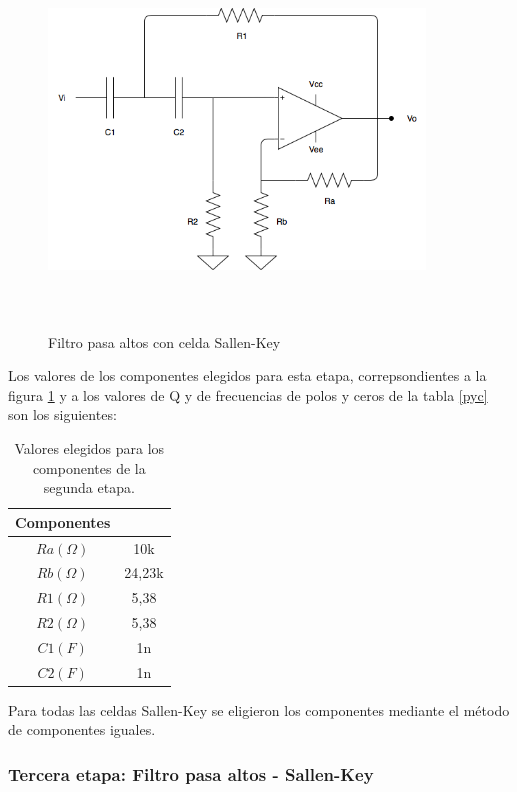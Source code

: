  \begin{figure}[H] %
	\centering
	\includegraphics[width=10cm,height=10cm,keepaspectratio]{../Imagenes/sk.png}
	\caption{Filtro pasa altos con celda Sallen-Key}
	\label{sk}
\end{figure}

Los valores de los componentes elegidos para esta etapa, correpsondientes a la figura \ref{sk} y a los valores de Q y de frecuencias de polos y ceros de la tabla \ref{pyc} son los siguientes:

\begin{table}[H] 
	\centering
	\begin{tabular}{c c}
		Componentes \\
		\hline
		$Ra (\Omega)$ &  10k \\
		$Rb (\Omega)$ & 24,23k\\
		$R1 (\Omega)$ &  5,38 \\
		$R2 (\Omega)$ &  5,38 \\
		$C1 (F)$ & 1n \\
		$C2 (F)$ & 1n \\
		\hline
	\end{tabular}
	\caption{Valores elegidos para los componentes de la segunda etapa.}
	\label{componentes2}
\end{table}

Para todas las celdas Sallen-Key se eligieron los componentes mediante el m\'etodo de componentes iguales.

\subsubsection{Tercera etapa: Filtro pasa altos - Sallen-Key}

